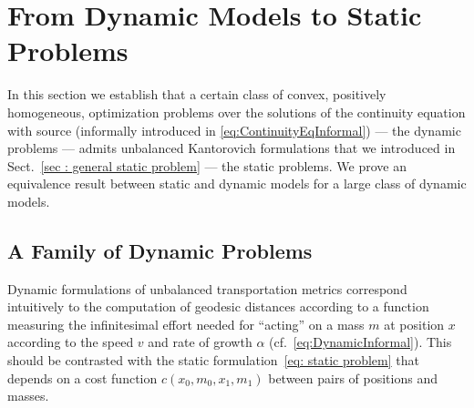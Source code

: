 

\section{From Dynamic Models to Static Problems}
\label{sec:DynamicToStatic}

In this section we establish that a certain class of convex, positively homogeneous, optimization problems over the solutions of the continuity equation with source (informally introduced in \ref{eq:ContinuityEqInformal}) --- the dynamic problems --- admits unbalanced Kantorovich formulations that we introduced in Sect.\ \ref{sec : general static problem} --- the static problems.
We prove an equivalence result between static and dynamic models for a large class of dynamic models.



\subsection{A Family of Dynamic Problems}

Dynamic formulations of unbalanced transportation metrics correspond intuitively to the computation of geodesic distances according to a function 
measuring the infinitesimal effort needed for ``acting'' on a mass $m$ at position $x$ according to the speed $v$ and rate of growth $\alpha$ (cf.~\eqref{eq:DynamicInformal}). This should be contrasted with the static formulation~\eqref{eq: static problem} that depends on a cost function $c(x_0,m_0,x_1,m_1)$ between pairs of positions and masses. 

